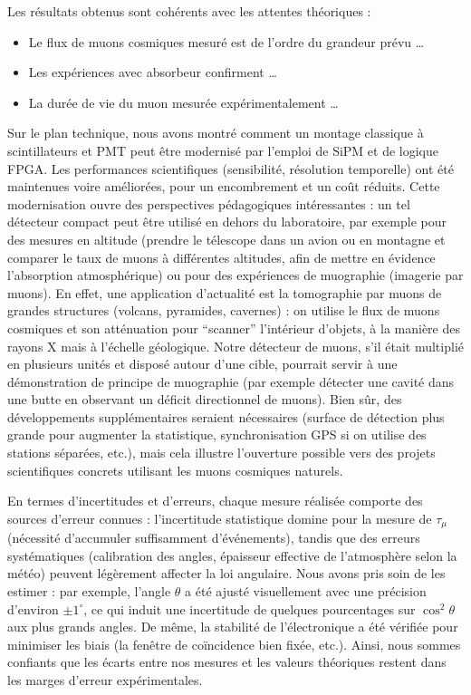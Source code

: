 \documentclass[a4paper,12pt,twoside]{article}
\begin{document}
Les résultats obtenus sont cohérents avec les attentes théoriques :
\begin{itemize}
  \item Le flux de muons cosmiques mesuré est de l’ordre du grandeur prévu …
  \item Les expériences avec absorbeur confirment …
  \item La durée de vie du muon mesurée expérimentalement …
\end{itemize}

Sur le plan technique, nous avons montré comment un montage classique à scintillateurs et PMT peut être modernisé par l’emploi de SiPM et de logique FPGA. Les performances scientifiques (sensibilité, résolution temporelle) ont été maintenues voire améliorées, pour un encombrement et un coût réduits. Cette modernisation ouvre des perspectives pédagogiques intéressantes : un tel détecteur compact peut être utilisé en dehors du laboratoire, par exemple pour des mesures en altitude (prendre le télescope dans un avion ou en montagne et comparer le taux de muons à différentes altitudes, afin de mettre en évidence l’absorption atmosphérique) ou pour des expériences de muographie (imagerie par muons). En effet, une application d’actualité est la tomographie par muons de grandes structures (volcans, pyramides, cavernes) : on utilise le flux de muons cosmiques et son atténuation pour “scanner” l’intérieur d’objets, à la manière des rayons X mais à l’échelle géologique. Notre détecteur de muons, s’il était multiplié en plusieurs unités et disposé autour d’une cible, pourrait servir à une démonstration de principe de muographie (par exemple détecter une cavité dans une butte en observant un déficit directionnel de muons). Bien sûr, des développements supplémentaires seraient nécessaires (surface de détection plus grande pour augmenter la statistique, synchronisation GPS si on utilise des stations séparées, etc.), mais cela illustre l’ouverture possible vers des projets scientifiques concrets utilisant les muons cosmiques naturels.

En termes d’incertitudes et d’erreurs, chaque mesure réalisée comporte des sources d’erreur connues : l’incertitude statistique domine pour la mesure de $\tau_\mu$ (nécessité d’accumuler suffisamment d’événements), tandis que des erreurs systématiques (calibration des angles, épaisseur effective de l’atmosphère selon la météo) peuvent légèrement affecter la loi angulaire. Nous avons pris soin de les estimer : par exemple, l’angle $\theta$ a été ajusté visuellement avec une précision d’environ $\pm 1^\circ$, ce qui induit une incertitude de quelques pourcentages sur $\cos^2\theta$ aux plus grands angles. De même, la stabilité de l’électronique a été vérifiée pour minimiser les biais (la fenêtre de coïncidence bien fixée, etc.). Ainsi, nous sommes confiants que les écarts entre nos mesures et les valeurs théoriques restent dans les marges d’erreur expérimentales.
\end{document}
